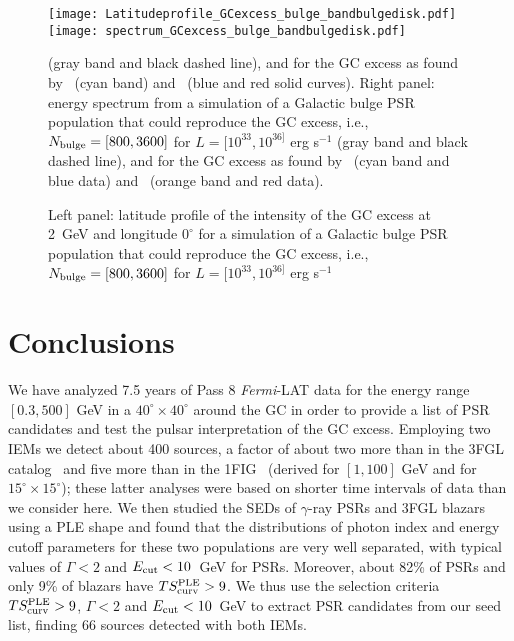 \documentclass[iop]{emulateapj}
\begin{document}
\begin{figure*}
	\centering
\texttt{[image: Latitudeprofile\_GCexcess\_bulge\_bandbulgedisk.pdf]}
\texttt{[image: spectrum\_GCexcess\_bulge\_bandbulgedisk.pdf]}
\caption{Left panel: latitude profile of the intensity of the GC excess at 2~GeV
  and longitude $0^{\circ}$ for a simulation of a Galactic
    bulge PSR population that could reproduce the GC excess, i.e.,
    $N_{\rm{bulge}}=[800, 3600]$ for $L = [10^{33},10^{36]}$ erg s$^{-1}$} (gray band and black dashed line), and for the
  GC excess as found by~\citet{Calore:2014xka} (cyan band)
  and~\cite{TheFermi-LAT:2017vmf} (blue and red solid curves). Right panel:
  energy spectrum from a simulation of a Galactic
    bulge PSR population that could reproduce the GC excess, i.e., 
    $N_{\rm{bulge}}=[800, 3600]$ for $L = [10^{33},10^{36]}$ erg s$^{-1}$ (gray band and black dashed line), and for the
  GC excess as found by~\citet{Calore:2014xka} (cyan band and blue
  data) and~\citet{TheFermi-LAT:2017vmf} (orange band and red data).
\label{fig:bulgepsr} 
\end{figure*}





\section{Conclusions}

\label{sec:conclusions}
We have analyzed 7.5 years of Pass 8 {\it Fermi}-LAT data for the
energy range $[0.3,500]$ GeV in a $40^{\circ}\times40^{\circ}$ around the GC in order to
provide a list of PSR candidates and test the pulsar interpretation of
the GC excess.  Employing two IEMs we detect about 400 sources, a
factor of about two more than in the 3FGL
catalog~\citep{2015ApJS..218...23A} and five more than in the
1FIG~\citep{2016ApJ...819...44A} (derived for $[1,100]$ GeV and for
$15^{\circ}\times15^{\circ}$); these latter analyses were based on
shorter time intervals of data than we consider here.  We then studied
the SEDs of $\gamma$-ray PSRs and 3FGL blazars using
a PLE shape and found that the distributions of photon index and
energy cutoff parameters for these two populations are very well
separated, with typical values of $\Gamma<2$ and
$E_{\rm{cut}}<10$~GeV for PSRs.  Moreover, about 82\%
of PSRs and only 9\% of blazars have $TS^{\rm{PLE}}_{\rm{curv}}>9$.
We thus use the selection criteria $TS^{\rm{PLE}}_{\rm{curv}}>9$,
$\Gamma<2$ and $E_{\rm{cut}}<10$~GeV to extract PSR
candidates from our seed list, finding 66 sources detected with both
IEMs.
\end{document}
